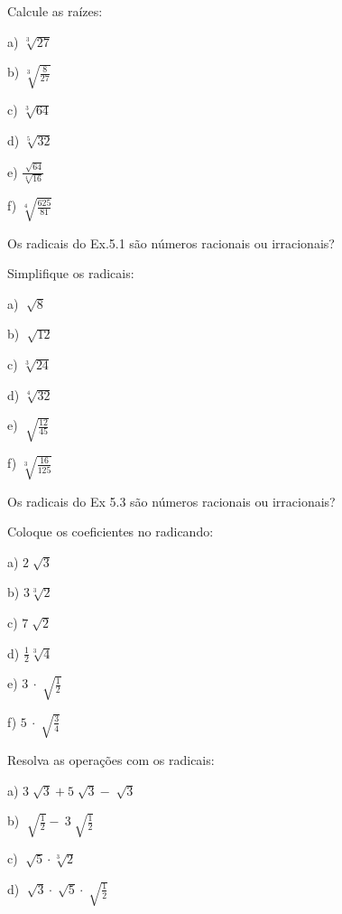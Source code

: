 \begin{exercicios}
	
	\exitem{} Calcule as raízes:

\begin{multicols}{6}
	
	a) \( \sqrt[3]{27} \)
	
	b)  \( \sqrt[3]{\frac{8}{27}} \)
	
	c)  \( \sqrt[3]{64} \)
	
	d)  \( \sqrt[5]{32} \)
	
	e)  \( \frac{\sqrt[]{64}}{\sqrt[4]{16}} \)
	
	f)  \( \sqrt[4]{\frac{625}{81}} \) 
\end{multicols}

	\exitem{} Os radicais do Ex.5.1 são números racionais ou irracionais?

	\exitem{} Simplifique os radicais:
	\begin{multicols}{6}

		 a) \(\sqrt[]{8} \)
		 
		 b)  \( \sqrt[]{12} \)
		 
		 c)  \( \sqrt[3]{24} \)
		 
		 d)  \( \sqrt[4]{32} \) 
		 
		 e)  \( \sqrt[]{\frac{12}{45}} \)
		 
		 f)  \( \sqrt[3]{\frac{16}{125}} \)
	\end{multicols}
	\exitem{} Os radicais do Ex 5.3 são números racionais ou irracionais?

	\exitem{} Coloque os coeficientes no radicando:
	\begin{multicols}{6}

	a) \( 2 \sqrt[]{3} \)
	
	b)  \( 3 \sqrt[3]{2} \)
	
	c)  \( 7 \sqrt[]{2} \)
	
	d)  \( \frac{1}{2}\sqrt[3]{4} \)
	
	e)  \( 3~ \cdot   \sqrt[]{\frac{1}{2}} \)
	
	f)  \( 5~ \cdot   \sqrt[]{\frac{3}{4}} \) 
	\end{multicols}
	\exitem{} Resolva as operações com os radicais:
	\begin{multicols}{4}
		a)  \( 3 \sqrt[]{3}+5\sqrt[]{3}-\sqrt[]{3} \) 
		
		b)  \( \sqrt[]{\frac{1}{2}}-~3  \sqrt[]{\frac{1}{2}} \)
		
		c)  \( \sqrt[]{5}  \cdot  \sqrt[3]{2} \)
		
		d)  \( \sqrt[]{3}  \cdot  \sqrt[]{5} \cdot \sqrt[]{\frac{1}{2}} \)
		

\end{multicols}
\end{exercicios}
